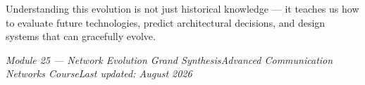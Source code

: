 Understanding this evolution is not just historical knowledge — it teaches us how to evaluate future technologies, predict architectural decisions, and design systems that can gracefully evolve.

\emph{Module 25 — Network Evolution Grand Synthesis}\CNbr{}\emph{Advanced Communication Networks Course}\CNbr{}\emph{Last updated: August 2026}
